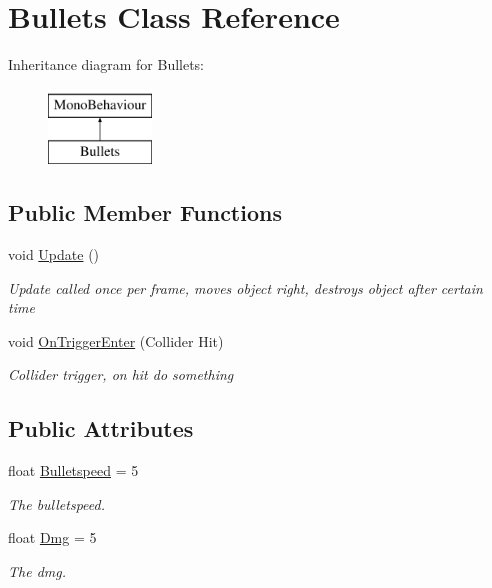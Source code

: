 \hypertarget{classBullets}{\section{Bullets Class Reference}
\label{classBullets}
}
Inheritance diagram for Bullets\-:\begin{figure}[H]
\begin{center}
\leavevmode
\includegraphics[height=2.000000cm]{classBullets}
\end{center}
\end{figure}
\subsection*{Public Member Functions}
\begin{DoxyCompactItemize}
\item 
void \hyperlink{classBullets_a5f8f1e6e26692c4309d245bfc82f262d}{Update} ()
\begin{DoxyCompactList}\small\item\em Update called once per frame, moves object right, destroys object after certain time \end{DoxyCompactList}\item 
void \hyperlink{classBullets_a15349b695ed15b96eda82606d5da773e}{On\-Trigger\-Enter} (Collider Hit)
\begin{DoxyCompactList}\small\item\em Collider trigger, on hit do something \end{DoxyCompactList}\end{DoxyCompactItemize}
\subsection*{Public Attributes}
\begin{DoxyCompactItemize}
\item 
float \hyperlink{classBullets_a9120f537885ce71eb6bda1fdc4c4bdba}{Bulletspeed} = 5
\begin{DoxyCompactList}\small\item\em The bulletspeed. \end{DoxyCompactList}\item 
float \hyperlink{classBullets_acc3d972e4c08788a0aff8b87faf7c3a6}{Dmg} = 5
\begin{DoxyCompactList}\small\item\em The dmg. \end{DoxyCompactList}\end{DoxyCompactItemize}


